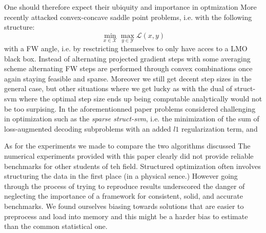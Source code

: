 One should therefore expect their ubiquity and importance in optmization More
recently \citet{gidelFrankWolfeAlgorithmsSaddle2016a} attacked convex-concave
saddle point problems, i.e. with the following structure:
\begin{equation}
  \min_{x\in \mathcal X} \max_{y\in\mathcal Y} \mathcal L(x,y)
\end{equation} with a FW angle, i.e. by resctricting themselves to only have
acces to a LMO black box. Instead of alternating projected gradient steps with
some averaging scheme alternating FW steps are performed through convex
combinations once again staying feasible and sparse. Moreover we still get
decent step sizes in the general case, but other situations where we get lucky
as with the dual of struct-svm where the optimal step size ends up being
computable analytically would not be too surpising. In the aforementionned
paper problems considered challenging in optimization such as the
\emph{sparse struct-svm}, i.e. the minimization of the sum of loss-augmented
decoding subproblems with an added $l1$ regularization term, and 


As for the experiments we made to compare the two algorithms discussed The
numerical experiments provided with this paper clearly did not provide reliable
benchmarks for other students of teh field. Structured optimization often
involves structuring the data in the first place (in a physical sence.) However
going through the process of trying to reproduce results underscored the danger
of neglecting the importance of a framework for consistent, solid, and accurate
benchmarks. We found ourselves biasing towards solutions that are easier to
preprocess and load into memory and this might be a harder bias to estimate than
the common statistical one. %
